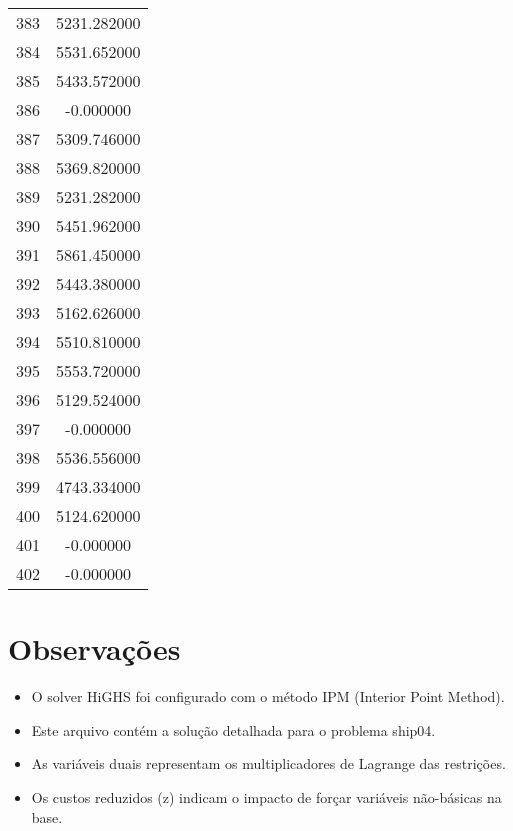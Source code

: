 \documentclass[12pt]{article}
\begin{document}
\begin{longtable}{@{}cc@{}}
383 & 5231.282000 \\
384 & 5531.652000 \\
385 & 5433.572000 \\
386 & -0.000000 \\
387 & 5309.746000 \\
388 & 5369.820000 \\
389 & 5231.282000 \\
390 & 5451.962000 \\
391 & 5861.450000 \\
392 & 5443.380000 \\
393 & 5162.626000 \\
394 & 5510.810000 \\
395 & 5553.720000 \\
396 & 5129.524000 \\
397 & -0.000000 \\
398 & 5536.556000 \\
399 & 4743.334000 \\
400 & 5124.620000 \\
401 & -0.000000 \\
402 & -0.000000 \\

\end{longtable}


\section{Observações}

\begin{itemize}
\item O solver HiGHS foi configurado com o método IPM (Interior Point Method).
\item Este arquivo contém a solução detalhada para o problema ship04.
\item As variáveis duais representam os multiplicadores de Lagrange das restrições.
\item Os custos reduzidos (z) indicam o impacto de forçar variáveis não-básicas na base.
\end{itemize}
\end{document}
